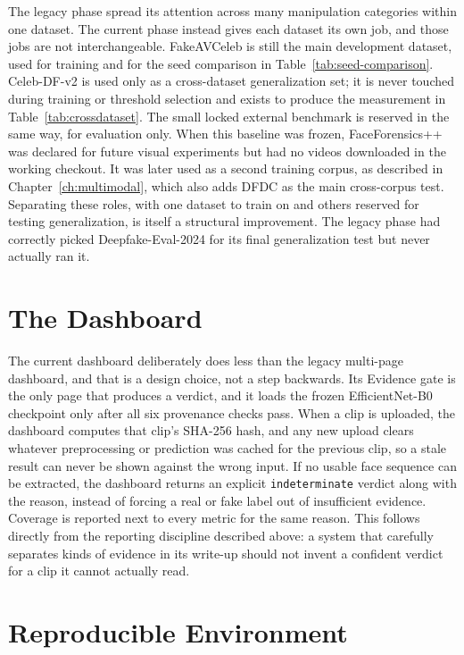 The legacy phase spread its attention across many manipulation categories
within one dataset. The current phase instead gives each dataset its own job,
and those jobs are not interchangeable. FakeAVCeleb is still the main
development dataset, used for training and for the seed comparison in
Table~\ref{tab:seed-comparison}. Celeb-DF-v2 is used only as a cross-dataset
generalization set; it is never touched during training or threshold selection
and exists to produce the measurement in Table~\ref{tab:crossdataset}. The
small locked external benchmark is reserved in the same way, for evaluation
only. When this baseline was frozen, FaceForensics++ was declared for future
visual experiments but had no videos downloaded in the working checkout. It was
later used as a second training corpus, as described in
Chapter~\ref{ch:multimodal}, which also adds DFDC as the main cross-corpus test.
Separating these roles, with one dataset to train on and others reserved for
testing generalization, is itself a structural improvement. The legacy phase
had correctly picked Deepfake-Eval-2024 for its final generalization test but
never actually ran it.

\section{The Dashboard}

The current dashboard deliberately does less than the legacy multi-page
dashboard, and that is a design choice, not a step backwards. Its Evidence gate
is the only page that produces a verdict, and it loads the frozen
EfficientNet-B0 checkpoint only after all six provenance checks pass. When a
clip is uploaded, the dashboard computes that clip's SHA-256 hash, and any new
upload clears whatever preprocessing or prediction was cached for the previous
clip, so a stale result can never be shown against the wrong input. If no
usable face sequence can be extracted, the dashboard returns an explicit
\texttt{indeterminate} verdict along with the reason, instead of forcing a real
or fake label out of insufficient evidence. Coverage is reported next to every
metric for the same reason. This follows directly from the reporting
discipline described above: a system that carefully separates kinds of
evidence in its write-up should not invent a confident verdict for a clip it
cannot actually read.

\section{Reproducible Environment}

